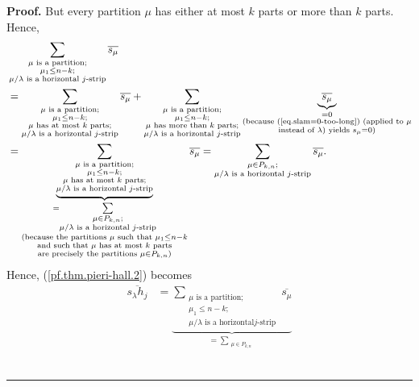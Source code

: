 \documentclass[numbers=enddot,12pt,final,onecolumn,notitlepage]{scrartcl}%
\theoremstyle{definition}
\newenvironment{proof}[1][Proof]{\noindent\textbf{#1.} }{\ \rule{0.5em}{0.5em}}
\let\sumnonlimits\sum
\renewcommand{\sum}{\sumnonlimits\limits}
\begin{document}
\begin{proof}
But every partition $\mu$ has either at most $k$ parts or more than $k$ parts.
Hence,
\begin{align*}
&  \sum_{\substack{\mu\text{ is a partition;}\\\mu_{1}\leq n-k;\\\mu
/\lambda\text{ is a horizontal }j\text{-strip}}}\overline{s_{\mu}}\\
&  =\sum_{\substack{\mu\text{ is a partition;}\\\mu_{1}\leq n-k;\\\mu\text{
has at most }k\text{ parts;}\\\mu/\lambda\text{ is a horizontal }%
j\text{-strip}}}\overline{s_{\mu}}+\sum_{\substack{\mu\text{ is a
partition;}\\\mu_{1}\leq n-k;\\\mu\text{ has more than }k\text{ parts;}%
\\\mu/\lambda\text{ is a horizontal }j\text{-strip}}}\underbrace{\overline
{s_{\mu}}}_{\substack{=0\\\text{(because (\ref{eq.slam=0-too-long}) (applied
to }\mu\\\text{instead of }\lambda\text{) yields }s_{\mu}=0\text{)}}}\\
&  =\underbrace{\sum_{\substack{\mu\text{ is a partition;}\\\mu_{1}\leq
n-k;\\\mu\text{ has at most }k\text{ parts;}\\\mu/\lambda\text{ is a
horizontal }j\text{-strip}}}}_{\substack{=\sum_{\substack{\mu\in P_{k,n}%
;\\\mu/\lambda\text{ is a horizontal }j\text{-strip}}}\\\text{(because the
partitions }\mu\text{ such that }\mu_{1}\leq n-k\\\text{and such that }%
\mu\text{ has at most }k\text{ parts}\\\text{are precisely the partitions }%
\mu\in P_{k,n}\text{)}}}\overline{s_{\mu}}=\sum_{\substack{\mu\in
P_{k,n};\\\mu/\lambda\text{ is a horizontal }j\text{-strip}}}\overline{s_{\mu
}}.
\end{align*}
Hence, (\ref{pf.thm.pieri-hall.2}) becomes%
\begin{align*}
\overline{s_{\lambda}h_{j}}  &  =\underbrace{\sum_{\substack{\mu\text{ is a
partition;}\\\mu_{1}\leq n-k;\\\mu/\lambda\text{ is a horizontal
}j\text{-strip}}}\overline{s_{\mu}}}_{=\sum_{\substack{\mu\in P_{k,n}%
}}}
\end{align*}
\end{proof}
\end{document}

